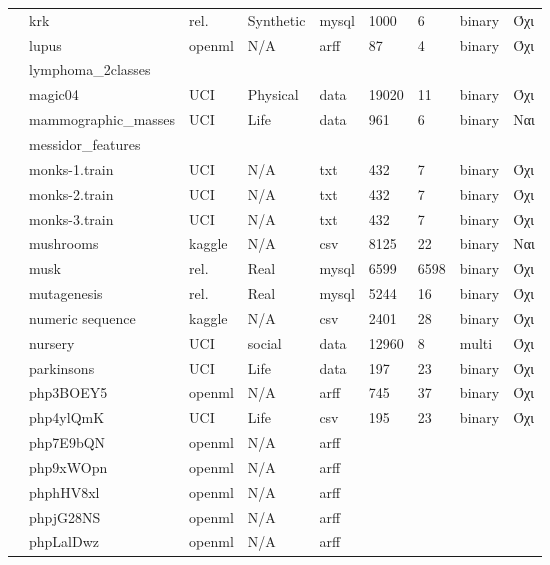 {\begin{longtable}{|l| l| l | l | l | l |l | l | l | }
 							\rownumber & krk \citep{krk} & rel. & Synthetic & mysql & 1000  & 6 & binary & Όχι \\
 							\rownumber & lupus \citep{lupus} & openml & N/A & arff & 87 & 4 & binary & Όχι \\
 							\rownumber & lymphoma\_2classes & & & & & & & \\
 			\rownumber & magic04 & UCI & Physical & data & 19020 & 11 & binary & Όχι \\
 			\rownumber & mammographic\_masses & UCI & Life & data & 961 & 6 & binary & Ναι \\
 			\rownumber & messidor\_features & & & & & & & \\
 			\rownumber & monks-1.train \citep{monks} & UCI & N/A & txt & 432 & 7 & binary & Όχι \\
 			\rownumber & monks-2.train \citep{monks} & UCI & N/A & txt & 432 & 7 & binary & Όχι \\
 			\rownumber & monks-3.train \citep{monks}& UCI & N/A & txt & 432 & 7 & binary & Όχι \\
 			\rownumber & mushrooms \citep{mushroom} & kaggle & N/A & csv & 8125 & 22 & binary & Ναι \\
 			\rownumber & musk \citep{musk} & rel. & Real & mysql & 6599
 			  & 6598 & binary & Όχι \\
 			\rownumber & mutagenesis \citep{Mutagenesis} & rel. & Real & mysql & 5244 & 16 & binary & Όχι \\
 			\rownumber & numeric sequence \citep{sequence} & kaggle & N/A & csv & 2401 & 28 & binary & Όχι \\
 			\rownumber & nursery \citep{nursery} & UCI & social & data & 12960 & 8 & multi & Όχι \\
 			\rownumber & parkinsons \citep{parkinsons} & UCI & Life & data & 197 & 23 & binary & Όχι \\
 			\rownumber & php3BOEY5 \citep{pie} & openml & N/A & arff & 745  & 37  &  binary& Όχι \\
 			\rownumber & php4ylQmK \citep{thyroid} & UCI & Life & csv & 195 & 23 & binary & Όχι \\
 			\rownumber & php7E9bQN & openml & N/A & arff & & & & \\
 			\rownumber & php9xWOpn & openml & N/A & arff & & & & \\
 			\rownumber & phphHV8xl & openml & N/A & arff & & & & \\
 			\rownumber & phpjG28NS & openml & N/A & arff & & & & \\
 			\rownumber & phpLalDwz & openml & N/A & arff & & & & \\

\end{longtable}}
